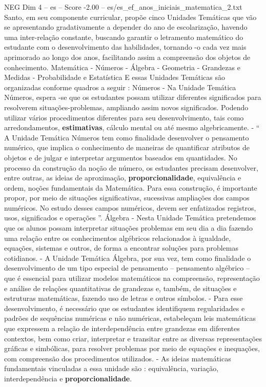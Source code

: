 \begin{textsample}{NEG Dim 4 – es – Score -2.00 – es/es\_ef\_anos\_iniciais\_matematica\_2.txt}
Santo, em seu componente curricular, propõe cinco Unidades Temáticas que vão se apresentando gradativamente a depender do ano de escolarização, havendo uma inter-relação constante, buscando garantir o letramento matemático do estudante com o desenvolvimento das habilidades, tornando -o cada vez mais aprimorado ao longo dos anos, facilitando assim a compreensão dos objetos de conhecimento.
Matemática - Números - Álgebra - Geometria - Grandezas e Medidas - Probabilidade e Estatística E essas Unidades Temáticas são organizadas conforme quadros a seguir : Números - Na Unidade Temática Números, espera -se que os estudantes possam utilizar diferentes significados para resolverem situações-problemas, ampliando assim novos significados.
Podendo utilizar vários procedimentos diferentes para seu desenvolvimento, tais como arredondamentos, \textbf{estimativas}, cálculo mental ou até mesmo algebricamente. - “ A Unidade Temática Números tem como finalidade desenvolver o pensamento numérico, que implica o conhecimento de maneiras de quantificar atributos de objetos e de julgar e interpretar argumentos baseados em quantidades.
No processo da construção da noção de número, os estudantes precisam desenvolver, entre outras, as ideias de aproximação, \textbf{proporcionalidade}, equivalência e ordem, noções fundamentais da Matemática.
Para essa construção, é importante propor, por meio de situações significativas, sucessivas ampliações dos campos numéricos.
No estudo desses campos numéricos, devem ser enfatizados registros, usos, significados e operações ”.
Álgebra - Nesta Unidade Temática pretendemos que os alunos possam interpretar situações problemas em seu dia a dia fazendo uma relação entre os conhecimentos algébricos relacionados à igualdade, equações, sistemas e outros, de forma a encontrar soluções para problemas cotidianos. - A Unidade Temática Álgebra, por sua vez, tem como finalidade o desenvolvimento de um tipo especial de pensamento – pensamento algébrico – que é essencial para utilizar modelos matemáticos na compreensão, representação e análise de relações quantitativas de grandezas e, também, de situações e estruturas matemáticas, fazendo uso de letras e outros símbolos. - Para esse desenvolvimento, é necessário que os estudantes identifiquem regularidades e padrões de sequências numéricas e não numéricas, estabeleçam leis matemáticas que expressem a relação de interdependência entre grandezas em diferentes contextos, bem como criar, interpretar e transitar entre as diversas representações gráficas e simbólicas, para resolver problemas por meio de equações e inequações, com compreensão dos procedimentos utilizados. - As ideias matemáticas fundamentais vinculadas a essa unidade são : equivalência, variação, interdependência e \textbf{proporcionalidade}.

\end{textsample}
